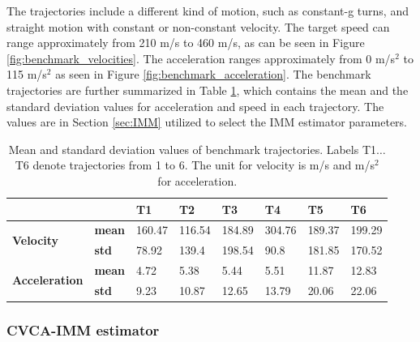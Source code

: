 \documentclass[english, 12pt, a4paper, elec, utf8, a-1b, online]{aaltothesis}
\begin{document}
The trajectories include a different kind of motion, such as constant-g turns, and straight motion with constant or non-constant velocity.
The target speed can range approximately from 210 m/s to 460 m/s, as can be seen in Figure \ref{fig:benchmark_velocities}.
The acceleration ranges approximately from 0 m/s$^2$ to 115 m/s$^2$ as seen in Figure \ref{fig:benchmark_acceleration}.
The benchmark trajectories are further summarized in Table \ref{tab:benchmark_table}, which contains the mean and the standard deviation values for acceleration and speed in each trajectory.
The values are in Section \ref{sec:IMM} utilized to select the IMM estimator parameters. 


\begin{table}[htb]
    \centering
\begin{tabular}{|l|l|l|l|l|l|l|l|}
\hline
\multicolumn{2}{|l|}{}                                 & \textbf{T1} & \textbf{T2} & \textbf{T3} & \textbf{T4} & \textbf{T5} & \textbf{T6} \\ \hline
\multirow{2}{*}{\textbf{Velocity}}     & \textbf{mean} & 160.47      & 116.54      & 184.89      & 304.76      & 189.37      & 199.29      \\ \cline{2-8} 
                                       & \textbf{std}  & 78.92       & 139.4       & 198.54      & 90.8        & 181.85      & 170.52      \\ \hline
\multirow{2}{*}{\textbf{Acceleration}} & \textbf{mean} & 4.72        & 5.38        & 5.44        & 5.51        & 11.87       & 12.83       \\ \cline{2-8} 
                                       & \textbf{std}  & 9.23        & 10.87       & 12.65       & 13.79       & 20.06       & 22.06       \\ \hline
\end{tabular}
    \caption{Mean and standard deviation values of benchmark trajectories. Labels T1$\ldots$T6 denote trajectories from 1 to 6. The unit for velocity is m/s and m/s$^2$ for acceleration.}
    \label{tab:benchmark_table}
\end{table}


\subsubsection{CVCA-IMM estimator}\label{sec:cvca_imm}
\end{document}
